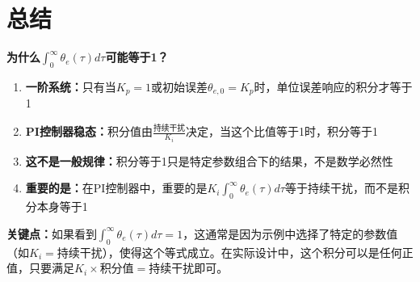 \documentclass[12pt,a4paper]{article}
\begin{document}
\section{总结}

\textbf{为什么$\int_0^{\infty} \theta_e(\tau) d\tau$可能等于1？}

\begin{enumerate}
\item \textbf{一阶系统：}只有当$K_p = 1$或初始误差$\theta_{e,0} = K_p$时，单位误差响应的积分才等于1

\item \textbf{PI控制器稳态：}积分值由$\frac{\text{持续干扰}}{K_i}$决定，当这个比值等于1时，积分等于1

\item \textbf{这不是一般规律：}积分等于1只是特定参数组合下的结果，不是数学必然性

\item \textbf{重要的是：}在PI控制器中，重要的是$K_i \int_0^{\infty} \theta_e(\tau) d\tau$等于持续干扰，而不是积分本身等于1
\end{enumerate}

\textbf{关键点：}如果看到$\int_0^{\infty} \theta_e(\tau) d\tau = 1$，这通常是因为示例中选择了特定的参数值（如$K_i = \text{持续干扰}$），使得这个等式成立。在实际设计中，这个积分可以是任何正值，只要满足$K_i \times \text{积分值} = \text{持续干扰}$即可。
\end{document}
